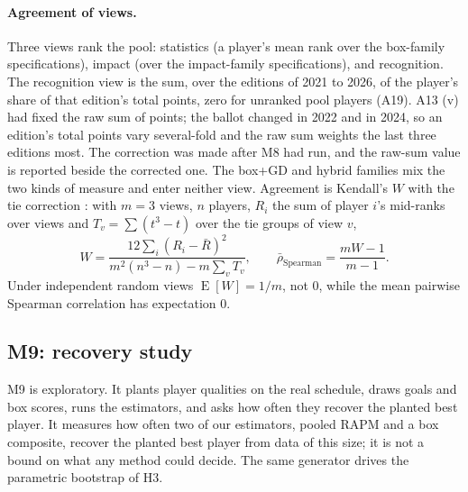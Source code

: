 \documentclass[11pt,a4paper]{article}
\DeclareMathOperator{\E}{E}
\begin{document}
\paragraph{Agreement of views.}
Three views rank the pool: statistics (a player's mean rank over the box-family
specifications), impact (over the impact-family specifications), and
recognition. The recognition view is the sum, over the editions of 2021 to
2026, of the player's share of that edition's total points, zero for unranked
pool players (A19). A13 (v) had fixed the raw sum of points; the ballot changed
in 2022 and in 2024, so an edition's total points vary several-fold and the raw
sum weights the last three editions most. The correction was made after M8
had run, and the raw-sum value is reported beside the corrected one. The box+GD and hybrid families mix the two kinds of measure
and enter neither view. Agreement is Kendall's $W$ with the tie correction
\citep{kendall1939rankings}: with $m = 3$ views, $n$ players, $R_i$ the sum of
player $i$'s mid-ranks over views and $T_v = \sum (t^3 - t)$ over the tie groups of
view $v$,
\begin{equation}
  W = \frac{12 \sum_i (R_i - \bar R)^2}{m^2 (n^3 - n) - m \sum_v T_v},
  \qquad
  \bar\rho_{\text{Spearman}} = \frac{mW - 1}{m - 1}.
  \label{eq:kendall}
\end{equation}
Under independent random views $\E[W] = 1/m$, not 0, while the mean pairwise
Spearman correlation has expectation 0.

\subsection{M9: recovery study}
\label{sec:m9}

M9 is exploratory. It plants player qualities on the real schedule, draws
goals and box scores, runs the estimators, and asks how often they recover the
planted best player. It measures how often two of our estimators, pooled
RAPM and a box composite, recover the planted best player from data of this
size; it is not a bound on what any method could decide. The same generator
drives the parametric bootstrap of H3.
\end{document}

